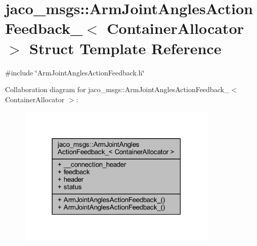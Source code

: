 \hypertarget{structjaco__msgs_1_1ArmJointAnglesActionFeedback__}{}\section{jaco\+\_\+msgs\+:\+:Arm\+Joint\+Angles\+Action\+Feedback\+\_\+$<$ Container\+Allocator $>$ Struct Template Reference}
\label{structjaco__msgs_1_1ArmJointAnglesActionFeedback__}


{\ttfamily \#include \char`\"{}Arm\+Joint\+Angles\+Action\+Feedback.\+h\char`\"{}}



Collaboration diagram for jaco\+\_\+msgs\+:\+:Arm\+Joint\+Angles\+Action\+Feedback\+\_\+$<$ Container\+Allocator $>$\+:
\nopagebreak
\begin{figure}[H]
\begin{center}
\leavevmode
\includegraphics[width=270pt]{d7/df4/structjaco__msgs_1_1ArmJointAnglesActionFeedback____coll__graph}
\end{center}
\end{figure}
